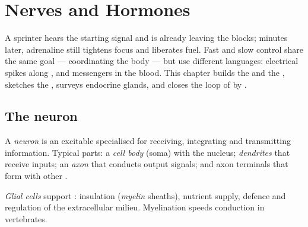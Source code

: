 \chapter{Nerves and Hormones}\label{ch:g12:nerves-hormones}

A sprinter hears the starting signal and is already leaving the blocks;
minutes later, adrenaline still tightens focus and liberates fuel. Fast
and slow control share the same goal --- coordinating the body --- but
use different languages: electrical spikes along , and 
messengers in the blood. This chapter builds the  and the ,
sketches the , surveys endocrine glands, and closes the
loop of  by .

\section{The neuron}

\begin{definition}[Neuron]\label{def:g12:nerves-hormones:neuron}
A \emph{neuron} is an excitable  specialised for
receiving, integrating and transmitting information. Typical parts: a
\emph{cell body} (soma) with the nucleus;
\emph{dendrites} that receive inputs; an \emph{axon}
 that conducts output signals; and axon terminals that form
 with other .
\end{definition}

\begin{definition}[Glia]\label{def:g12:nerves-hormones:glia}
\emph{Glial cells} support : insulation
(\emph{myelin} sheaths), nutrient supply, defence and
regulation of the extracellular milieu. Myelination speeds conduction
in vertebrates.
\end{definition}

